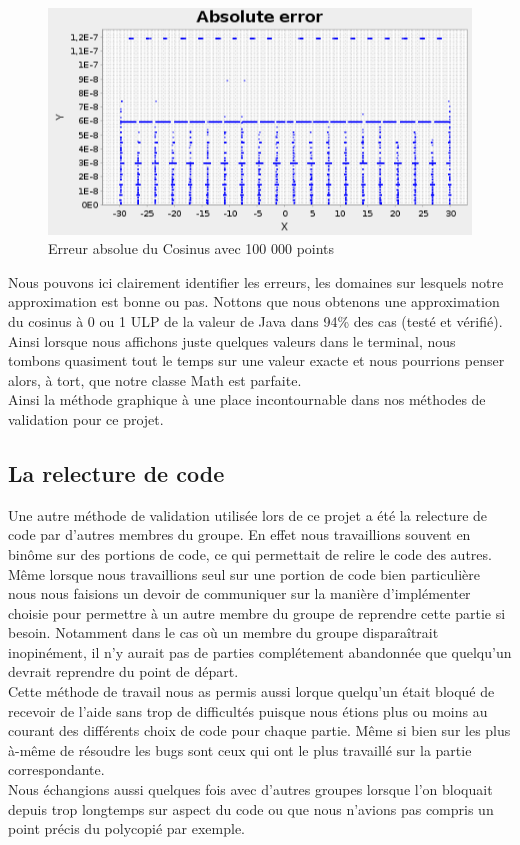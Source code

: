 \documentclass{article}
\begin{document}
\begin{figure}[h!]
    \begin{center}
      \includegraphics[scale=0.28]{ErrorAbsCosMini.png}
      \caption{Erreur absolue du Cosinus avec 100 000 points}
      \label{Erreur absolue du Cosinus avec 100 000 points}
    \end{center}
\end{figure}


Nous pouvons ici clairement identifier les erreurs, les domaines sur lesquels notre approximation est bonne ou pas. Nottons que nous obtenons une approximation du cosinus
à 0 ou 1 ULP de la valeur de Java dans 94\% des cas (testé et vérifié). Ainsi lorsque nous affichons juste quelques valeurs dans le terminal, nous tombons quasiment tout
le temps sur une valeur exacte et nous pourrions penser alors, à tort, que notre classe Math est parfaite. \\
Ainsi la méthode graphique à une place incontournable dans nos méthodes de validation pour ce projet.

\subsection{La relecture de code}

Une autre méthode de validation utilisée lors de ce projet a été la relecture de code par d'autres membres du groupe. En effet nous travaillions souvent en binôme sur des portions
de code, ce qui permettait de relire le code des autres. Même lorsque nous travaillions seul sur une portion de code bien particulière nous nous faisions un devoir de communiquer
sur la manière d'implémenter choisie pour permettre à un autre membre du groupe de reprendre cette partie si besoin. Notamment dans le cas où un membre du groupe disparaîtrait inopinément, il n'y aurait pas
de parties complétement abandonnée que quelqu'un devrait reprendre du point de départ.
\\
Cette méthode de travail nous as permis aussi lorque quelqu'un était bloqué de recevoir de l'aide sans trop de difficultés puisque nous étions plus ou moins au courant
des différents choix de code pour chaque partie.
Même si bien sur les plus à-même de résoudre les bugs sont ceux qui ont le plus travaillé sur la partie correspondante.
\\
Nous échangions aussi quelques fois avec d'autres groupes lorsque l'on bloquait depuis trop longtemps sur aspect du code ou que nous n'avions pas compris un point précis du polycopié par exemple.
\end{document}
